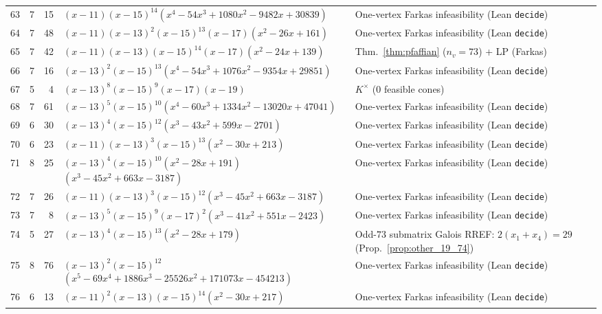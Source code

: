 \documentclass[11pt,reqno]{amsart}
\theoremstyle{definition}
\theoremstyle{remark}
\numberwithin{equation}{section}
\numberwithin{table}{section}
\begin{document}
{\begin{longtable}{@{}rrr>{\raggedright\arraybackslash}p{2.50in}>{\raggedright\arraybackslash}p{2.30in}@{}}
63 & 7 & 15 & $(x-11)$\allowbreak $(x-15)^{14}$\allowbreak $(x^4-54x^3+1080x^2-9482x+30839)$ & One-vertex Farkas infeasibility (Lean \texttt{decide}) \\
64 & 7 & 48 & $(x-11)$\allowbreak $(x-13)^2$\allowbreak $(x-15)^{13}$\allowbreak $(x-17)$\allowbreak $(x^2-26x+161)$ & One-vertex Farkas infeasibility (Lean \texttt{decide}) \\
65 & 7 & 42 & $(x-11)$\allowbreak $(x-13)$\allowbreak $(x-15)^{14}$\allowbreak $(x-17)$\allowbreak $(x^2-24x+139)$ & Thm.~\ref{thm:pfaffian} ($n_v=73$) + LP (Farkas) \\
66 & 7 & 16 & $(x-13)^2$\allowbreak $(x-15)^{13}$\allowbreak $(x^4-54x^3+1076x^2-9354x+29851)$ & One-vertex Farkas infeasibility (Lean \texttt{decide}) \\
67 & 5 & 4 & $(x-13)^8$\allowbreak $(x-15)^9$\allowbreak $(x-17)$\allowbreak $(x-19)$ & $K^\times$ ($0$ feasible cones) \\
68 & 7 & 61 & $(x-13)^5$\allowbreak $(x-15)^{10}$\allowbreak $(x^4-60x^3+1334x^2-13020x+47041)$ & One-vertex Farkas infeasibility (Lean \texttt{decide}) \\
69 & 6 & 30 & $(x-13)^4$\allowbreak $(x-15)^{12}$\allowbreak $(x^3-43x^2+599x-2701)$ & One-vertex Farkas infeasibility (Lean \texttt{decide}) \\
70 & 6 & 23 & $(x-11)$\allowbreak $(x-13)^3$\allowbreak $(x-15)^{13}$\allowbreak $(x^2-30x+213)$ & One-vertex Farkas infeasibility (Lean \texttt{decide}) \\
71 & 8 & 25 & $(x-13)^4$\allowbreak $(x-15)^{10}$\allowbreak $(x^2-28x+191)$\allowbreak $(x^3-45x^2+663x-3187)$ & One-vertex Farkas infeasibility (Lean \texttt{decide}) \\
72 & 7 & 26 & $(x-11)$\allowbreak $(x-13)^3$\allowbreak $(x-15)^{12}$\allowbreak $(x^3-45x^2+663x-3187)$ & One-vertex Farkas infeasibility (Lean \texttt{decide}) \\
73 & 7 & 8 & $(x-13)^5$\allowbreak $(x-15)^9$\allowbreak $(x-17)^2$\allowbreak $(x^3-41x^2+551x-2423)$ & One-vertex Farkas infeasibility (Lean \texttt{decide}) \\
74 & 5 & 27 & $(x-13)^4$\allowbreak $(x-15)^{13}$\allowbreak $(x^2-28x+179)$ & Odd-$73$ submatrix Galois RREF: $2(x_1+x_4)=29$ (Prop.~\ref{prop:other_19_74}) \\
75 & 8 & 76 & $(x-13)^2$\allowbreak $(x-15)^{12}$\allowbreak $(x^5-69x^4+1886x^3-25526x^2+171073x-454213)$ & One-vertex Farkas infeasibility (Lean \texttt{decide}) \\
76 & 6 & 13 & $(x-11)^2$\allowbreak $(x-13)$\allowbreak $(x-15)^{14}$\allowbreak $(x^2-30x+217)$ & One-vertex Farkas infeasibility (Lean \texttt{decide}) \\

\end{longtable}}
\end{document}
